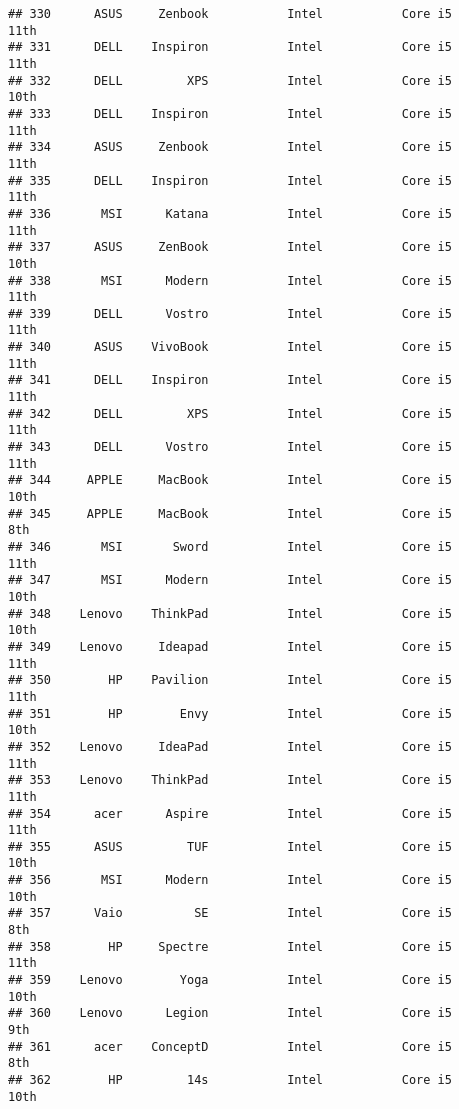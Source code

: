 \documentclass[
]{article}
\begin{document}
\begin{verbatim}
## 330      ASUS     Zenbook           Intel           Core i5            11th
## 331      DELL    Inspiron           Intel           Core i5            11th
## 332      DELL         XPS           Intel           Core i5            10th
## 333      DELL    Inspiron           Intel           Core i5            11th
## 334      ASUS     Zenbook           Intel           Core i5            11th
## 335      DELL    Inspiron           Intel           Core i5            11th
## 336       MSI      Katana           Intel           Core i5            11th
## 337      ASUS     ZenBook           Intel           Core i5            10th
## 338       MSI      Modern           Intel           Core i5            11th
## 339      DELL      Vostro           Intel           Core i5            11th
## 340      ASUS    VivoBook           Intel           Core i5            11th
## 341      DELL    Inspiron           Intel           Core i5            11th
## 342      DELL         XPS           Intel           Core i5            11th
## 343      DELL      Vostro           Intel           Core i5            11th
## 344     APPLE     MacBook           Intel           Core i5            10th
## 345     APPLE     MacBook           Intel           Core i5             8th
## 346       MSI       Sword           Intel           Core i5            11th
## 347       MSI      Modern           Intel           Core i5            10th
## 348    Lenovo    ThinkPad           Intel           Core i5            10th
## 349    Lenovo     Ideapad           Intel           Core i5            11th
## 350        HP    Pavilion           Intel           Core i5            11th
## 351        HP        Envy           Intel           Core i5            10th
## 352    Lenovo     IdeaPad           Intel           Core i5            11th
## 353    Lenovo    ThinkPad           Intel           Core i5            11th
## 354      acer      Aspire           Intel           Core i5            11th
## 355      ASUS         TUF           Intel           Core i5            10th
## 356       MSI      Modern           Intel           Core i5            10th
## 357      Vaio          SE           Intel           Core i5             8th
## 358        HP     Spectre           Intel           Core i5            11th
## 359    Lenovo        Yoga           Intel           Core i5            10th
## 360    Lenovo      Legion           Intel           Core i5             9th
## 361      acer    ConceptD           Intel           Core i5             8th
## 362        HP         14s           Intel           Core i5            10th

\end{verbatim}
\end{document}
